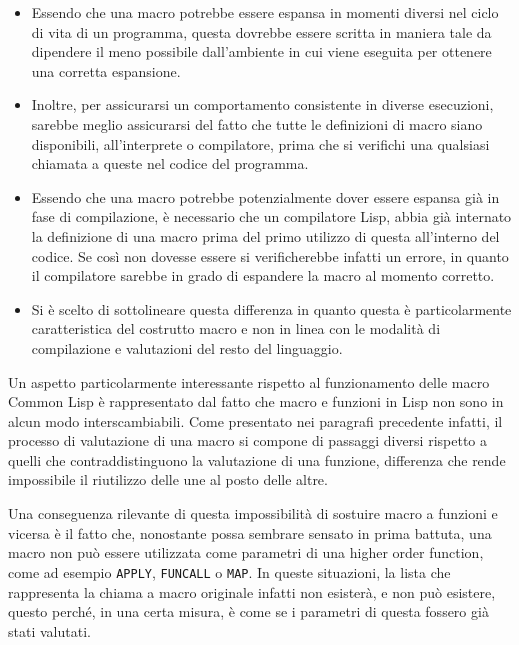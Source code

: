 \begin{itemize}

\item Essendo che una macro potrebbe essere espansa in momenti diversi nel ciclo di vita di un programma, questa dovrebbe essere scritta in maniera tale da dipendere il meno possibile dall’ambiente in cui viene eseguita per ottenere una corretta espansione.

\item Inoltre, per assicurarsi un comportamento consistente in diverse esecuzioni, sarebbe meglio assicurarsi del fatto che tutte le definizioni di macro siano disponibili, all’interprete o compilatore, prima che si verifichi una qualsiasi chiamata a queste nel codice del programma.

\item Essendo che una macro potrebbe potenzialmente dover essere espansa già in fase di compilazione, è necessario che un compilatore Lisp, abbia già internato la definizione di una macro prima del primo utilizzo di questa all’interno del codice. Se così non dovesse essere si verificherebbe infatti un errore, in quanto il compilatore sarebbe in grado di espandere la macro al momento corretto.

\item Si è scelto di sottolineare questa differenza in quanto questa è particolarmente caratteristica del costrutto macro e non in linea con le modalità di compilazione e valutazioni del resto del linguaggio.

\end{itemize}

Un aspetto particolarmente interessante rispetto al funzionamento delle macro
Common Lisp è rappresentato dal fatto che macro e funzioni in Lisp non sono in
alcun modo interscambiabili. Come presentato nei paragrafi precedente infatti,
il processo di valutazione di una macro si compone di passaggi diversi rispetto
a quelli che contraddistinguono la valutazione di una funzione, differenza che
rende impossibile il riutilizzo delle une al posto delle altre.

Una conseguenza rilevante di questa impossibilità di sostuire macro a funzioni
e vicersa è il fatto che, nonostante possa sembrare sensato in prima battuta,
una macro non può essere utilizzata come parametri di una higher order
function, come ad esempio \texttt{APPLY}, \texttt{FUNCALL} o \texttt{MAP}. In
queste situazioni, la lista che rappresenta la chiama a macro originale infatti
non esisterà, e non può esistere, questo perché, in una certa misura, è come se
i parametri di questa fossero già stati valutati.
